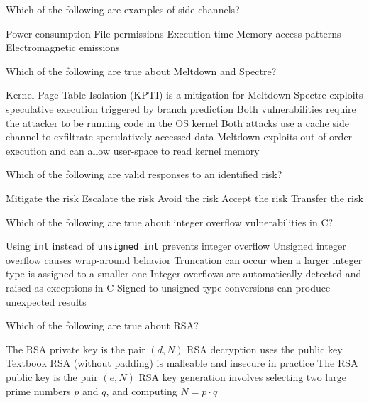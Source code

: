 \documentclass[addpoints]{exam}
\begin{document}
\begin{questions}
\question Which of the following are examples of side channels?

\begin{checkboxes}
  \CorrectChoice Power consumption
  \choice File permissions
  \CorrectChoice Execution time
  \CorrectChoice Memory access patterns
  \CorrectChoice Electromagnetic emissions
\end{checkboxes}


\question Which of the following are true about Meltdown and Spectre?

\begin{checkboxes}
  \CorrectChoice Kernel Page Table Isolation (KPTI) is a mitigation for Meltdown
  \CorrectChoice Spectre exploits speculative execution triggered by branch prediction
  \choice Both vulnerabilities require the attacker to be running code in the OS kernel
  \CorrectChoice Both attacks use a cache side channel to exfiltrate speculatively accessed data
  \CorrectChoice Meltdown exploits out-of-order execution and can allow user-space to read kernel memory
\end{checkboxes}



\question Which of the following are valid responses to an identified risk?

\begin{checkboxes}
  \CorrectChoice Mitigate the risk
  \choice Escalate the risk
  \CorrectChoice Avoid the risk
  \CorrectChoice Accept the risk
  \CorrectChoice Transfer the risk
\end{checkboxes}


\question Which of the following are true about integer overflow vulnerabilities in C?

\begin{checkboxes}
  \choice Using \texttt{int} instead of \texttt{unsigned int} prevents integer overflow
  \CorrectChoice Unsigned integer overflow causes wrap-around behavior
  \CorrectChoice Truncation can occur when a larger integer type is assigned to a smaller one
  \choice Integer overflows are automatically detected and raised as exceptions in C
  \CorrectChoice Signed-to-unsigned type conversions can produce unexpected results
\end{checkboxes}


\question Which of the following are true about RSA?

\begin{checkboxes}
  \CorrectChoice The RSA private key is the pair $(d, N)$
  \choice RSA decryption uses the public key
  \CorrectChoice Textbook RSA (without padding) is malleable and insecure in practice
  \CorrectChoice The RSA public key is the pair $(e, N)$
  \CorrectChoice RSA key generation involves selecting two large prime numbers $p$ and $q$, and computing $N = p \cdot q$
\end{checkboxes}


\end{questions}
\end{document}

